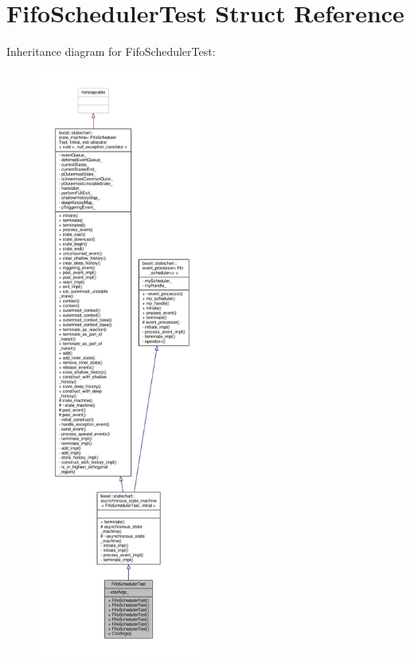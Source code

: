 \hypertarget{struct_fifo_scheduler_test}{}\section{Fifo\+Scheduler\+Test Struct Reference}
\label{struct_fifo_scheduler_test}


Inheritance diagram for Fifo\+Scheduler\+Test\+:
\nopagebreak
\begin{figure}[H]
\begin{center}
\leavevmode
\includegraphics[height=550pt]{struct_fifo_scheduler_test__inherit__graph}
\end{center}
\end{figure}


